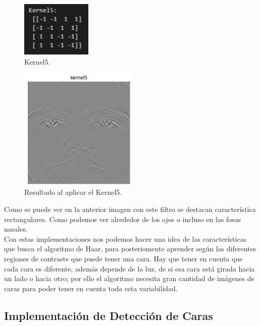 \documentclass[a4paper]{article}
\begin{document}
\begin{figure}[H]
    \centering
    \includegraphics[width=0.30\textwidth]{../img/k5.png}
    \caption{Kernel5.}
\end{figure}

\begin{figure}[H]
    \centering
    \includegraphics[width=0.50\textwidth]{../img/resultadok5.png}
    \caption{Resultado al aplicar el Kernel5.}
\end{figure}

Como se puede ver en la anterior imagen con este filtro se destacan característica rectangulares.
Como podemos ver alrededor de los ojos o incluso en las fosas nasales.\\



Con estas implementaciones nos podemos hacer una idea de las características que busca el algoritmo de Haar, para posteriomente aprender según las diferentes regiones de contraste que puede tener una cara.
Hay que tener en cuenta que cada cara es diferente, además depende de la luz, de si esa cara está girada hacia un lado o hacia otro; por ello el algoritmo necesita gran cantidad de imágenes de caras para poder tener en cuenta toda esta variabilidad.



\subsection{Implementación de Detección de Caras}
\end{document}
